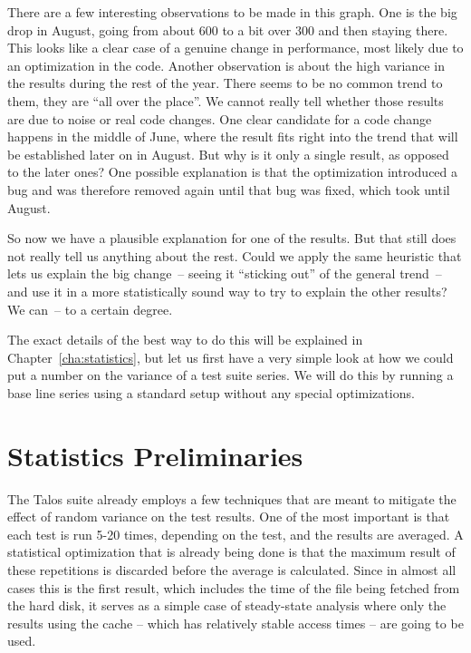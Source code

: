 There are a few interesting observations to be made in this graph. One is the
big drop in August, going from about 600 to a bit over 300 and then staying
there. This looks like a clear case of a genuine change in performance, most
likely due to an optimization in the code. Another observation is about the
high variance in the results during the rest of the year. There seems to be no
common trend to them, they are ``all over the place''. We cannot really tell
whether those results are due to noise or real code changes. One clear
candidate for a code change happens in the middle of June, where the result
fits right into the trend that will be established later on in August. But why
is it only a single result, as opposed to the later ones? One possible
explanation is that the optimization introduced a bug and was therefore
removed again until that bug was fixed, which took until August.

So now we have a plausible explanation for one of the results. But that still
does not really tell us anything about the rest. Could we apply the same
heuristic that lets us explain the big change~-- seeing it ``sticking out'' of
the general trend~-- and use it in a more statistically sound way to try to
explain the other results? We can~-- to a certain degree.

The exact details of the best way to do this will be explained in
Chapter~\ref{cha:statistics}, but let us first have a very simple look at how
we could put a number on the variance of a test suite series. We will do this
by running a base line series using a standard setup without any special
optimizations.

\section{Statistics Preliminaries} %
\label{sec:bg:stats}

The Talos suite already employs a few techniques that are meant to mitigate
the effect of random variance on the test results. One of the most important
is that each test is run 5-20 times, depending on the test, and the results
are averaged. A statistical optimization that is already being done is that
the maximum result of these repetitions is discarded before the average is
calculated. Since in almost all cases this is the first result, which includes
the time of the file being fetched from the hard disk, it serves as a simple
case of steady-state analysis where only the results using the cache -- which
has relatively stable access times -- are going to be used.

